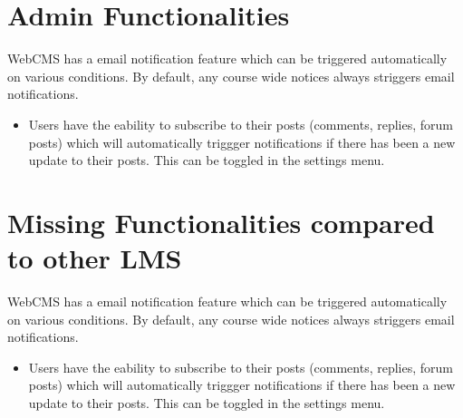 \section{Admin Functionalities}
WebCMS has a email notification feature which can be triggered automatically on various conditions. By default, any course wide notices always striggers email notifications.
\begin{itemize}
\item Users have the eability to subscribe to their posts (comments, replies, forum posts) which will automatically triggger notifications if there has been a new update to their posts. This can be toggled in the settings menu.
\end{itemize}

\section{Missing Functionalities compared to other LMS}
WebCMS has a email notification feature which can be triggered automatically on various conditions. By default, any course wide notices always striggers email notifications.
\begin{itemize}
\item Users have the eability to subscribe to their posts (comments, replies, forum posts) which will automatically triggger notifications if there has been a new update to their posts. This can be toggled in the settings menu.
\end{itemize}